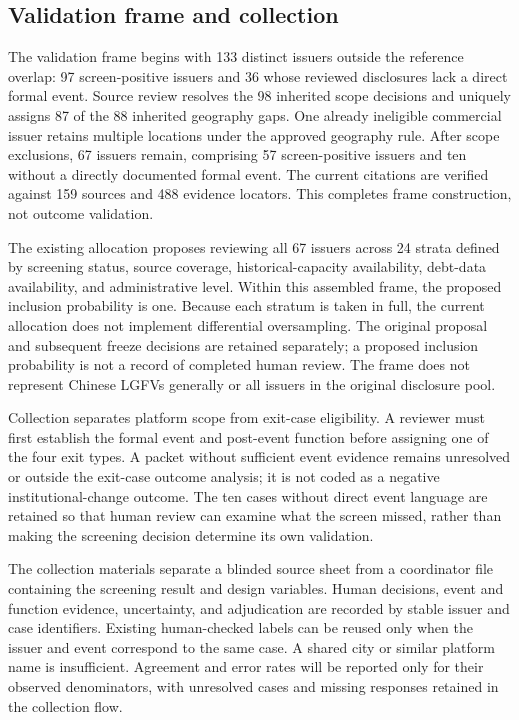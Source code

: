 \subsection{Validation frame and collection}

The validation frame begins with 133 distinct issuers outside the reference
overlap: 97 screen-positive issuers and 36 whose reviewed disclosures lack a
direct formal event. Source review resolves the 98 inherited scope decisions
and uniquely assigns 87 of the 88 inherited geography gaps. One already
ineligible commercial issuer retains multiple locations under the approved
geography rule. After scope exclusions, 67 issuers remain, comprising 57
screen-positive issuers and ten without a directly documented formal event.
The current citations are verified against 159 sources and 488 evidence
locators. This completes frame construction, not outcome validation.

The existing allocation proposes reviewing all 67 issuers across 24 strata
defined by screening status, source coverage, historical-capacity availability,
debt-data availability, and administrative level. Within this assembled frame,
the proposed inclusion probability is one. Because each stratum is taken in
full, the current allocation does not implement differential oversampling.
The original proposal and subsequent freeze decisions are retained separately;
a proposed inclusion probability is not a record of completed human review.
The frame does not represent Chinese LGFVs generally or all issuers in the
original disclosure pool.

Collection separates platform scope from exit-case eligibility. A reviewer
must first establish the formal event and post-event function before assigning
one of the four exit types. A packet without sufficient event evidence remains
unresolved or outside the exit-case outcome analysis; it is not coded as a
negative institutional-change outcome. The ten cases without direct event
language are retained so that human review can examine what the screen missed,
rather than making the screening decision determine its own validation.

The collection materials separate a blinded source sheet from a coordinator
file containing the screening result and design variables. Human decisions,
event and function evidence, uncertainty, and adjudication are recorded by
stable issuer and case identifiers. Existing human-checked labels can be reused
only when the issuer and event correspond to the same case. A shared city or
similar platform name is insufficient. Agreement and error rates will be
reported only for their observed denominators, with unresolved cases and
missing responses retained in the collection flow.
